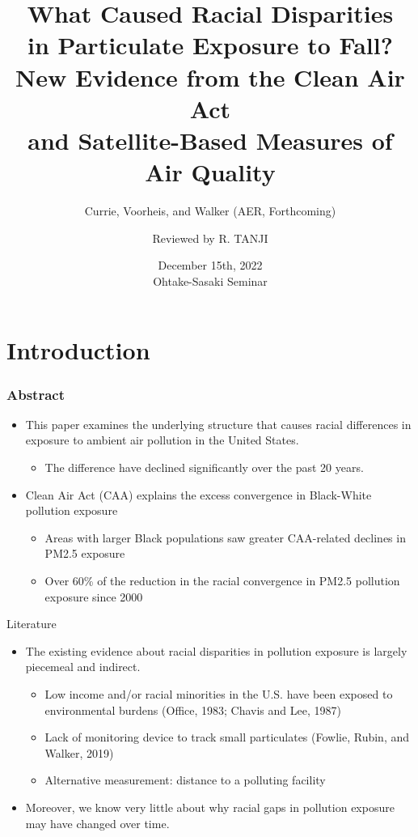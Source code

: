 \documentclass[dvipdfmx,11pt]{beamer}
\title[Currie, Voorheis, and Walker, Forthcoming]{What Caused Racial Disparities \\ in Particulate Exposure to Fall? \\ New Evidence from the Clean Air Act \\ and Satellite-Based Measures of Air Quality}
\subtitle{Currie, Voorheis, and Walker (AER, Forthcoming)}
\author{Reviewed by R. TANJI}
\date[12/15/2022 OS Semi.]{December 15th, 2022 \\ Ohtake-Sasaki Seminar}
\institute[]{Osaka University, Graduate School of Economics}
\begin{document}
\begin{frame}\frametitle{}
\titlepage
\end{frame}

\section{Introduction}

\begin{frame}\frametitle{Abstract}
  \begin{itemize}
    \item This paper examines the underlying structure that causes racial differences in exposure to ambient air pollution in the United States.
    \begin{itemize}
      \item The difference have declined significantly over the past 20 years.
    \end{itemize}
    \item Clean Air Act (CAA) explains the excess convergence in Black-White pollution exposure
    \begin{itemize}
      \item Areas with larger Black populations saw greater CAA-related declines in PM2.5 exposure
      \item Over 60\% of the reduction in the racial convergence in PM2.5 pollution exposure since 2000
    \end{itemize}
  \end{itemize}
\end{frame}

\frame{\tableofcontents}

\begin{frame}{Literature}
  \begin{itemize}
    \item The existing evidence about racial disparities in pollution exposure is largely piecemeal and indirect.
    \begin{itemize}
      \item Low income and/or racial minorities in the U.S. have been exposed to environmental burdens (Office, 1983; Chavis and Lee, 1987)
      \item Lack of monitoring device to track small particulates (Fowlie, Rubin, and Walker, 2019)
      \item Alternative measurement: distance to a polluting facility
    \end{itemize}
    \item Moreover, we know very little about why racial gaps in pollution exposure may have changed over time.
  \end{itemize}
\end{frame}
\end{document}
